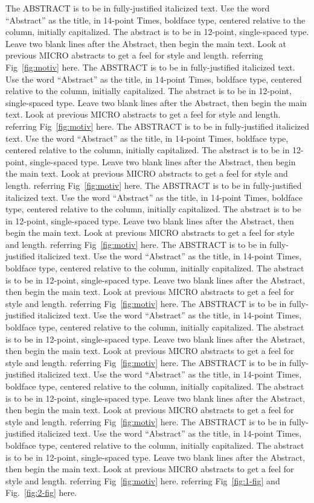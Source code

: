 The ABSTRACT is to be in fully-justified italicized text. Use the word ``Abstract'' as the title, in
14-point Times, boldface type, centered relative to the column, initially capitalized. The abstract
is to be in 12-point, single-spaced type. Leave two blank lines after the Abstract, then begin the
main text. Look at previous MICRO abstracts to get a feel for style and length. referring
Fig~\ref{fig:motiv} here. The ABSTRACT is to be in fully-justified italicized text. Use the word
``Abstract'' as the title, in 14-point Times, boldface type, centered relative to the column,
initially capitalized. The abstract is to be in 12-point, single-spaced type. Leave two blank lines
after the Abstract, then begin the main text. Look at previous MICRO abstracts to get a feel for
style and length. referring Fig~\ref{fig:motiv} here. The ABSTRACT is to be in fully-justified
italicized text. Use the word ``Abstract'' as the title, in 14-point Times, boldface type, centered
relative to the column, initially capitalized. The abstract is to be in 12-point, single-spaced type.
Leave two blank lines after the Abstract, then begin the main text. Look at previous MICRO abstracts
to get a feel for style and length. referring Fig~\ref{fig:motiv} here. The ABSTRACT is to be in
fully-justified italicized text. Use the word ``Abstract'' as the title, in 14-point Times, boldface
type, centered relative to the column, initially capitalized. The abstract is to be in 12-point,
single-spaced type. Leave two blank lines after the Abstract, then begin the main text. Look at
previous MICRO abstracts to get a feel for style and length. referring Fig~\ref{fig:motiv} here. The
ABSTRACT is to be in fully-justified italicized text. Use the word ``Abstract'' as the title, in
14-point Times, boldface type, centered relative to the column, initially capitalized. The abstract
is to be in 12-point, single-spaced type. Leave two blank lines after the Abstract, then begin the
main text. Look at previous MICRO abstracts to get a feel for style and length. referring
Fig~\ref{fig:motiv} here. The ABSTRACT is to be in fully-justified italicized text. Use the word
``Abstract'' as the title, in 14-point Times, boldface type, centered relative to the column,
initially capitalized. The abstract is to be in 12-point, single-spaced type. Leave two blank lines
after the Abstract, then begin the main text. Look at previous MICRO abstracts to get a feel for
style and length. referring Fig~\ref{fig:motiv} here. The ABSTRACT is to be in fully-justified
italicized text. Use the word ``Abstract'' as the title, in 14-point Times, boldface type, centered
relative to the column, initially capitalized. The abstract is to be in 12-point, single-spaced type.
Leave two blank lines after the Abstract, then begin the main text. Look at previous MICRO abstracts
to get a feel for style and length. referring Fig~\ref{fig:motiv} here. The ABSTRACT is to be in
fully-justified italicized text. Use the word ``Abstract'' as the title, in 14-point Times, boldface
type, centered relative to the column, initially capitalized. The abstract is to be in 12-point,
single-spaced type. Leave two blank lines after the Abstract, then begin the main text. Look at
previous MICRO abstracts to get a feel for style and length. referring Fig~\ref{fig:motiv} here.
referring Fig~\ref{fig:1-fig} and Fig.~\ref{fig:2-fig} here.
